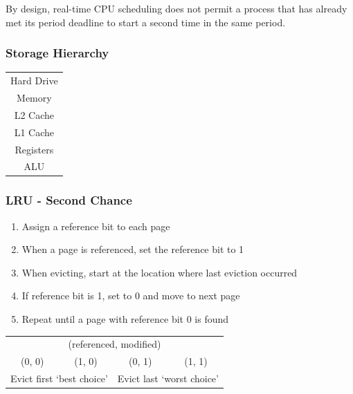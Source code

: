 \documentclass[a4paper]{article}
\begin{document}
\begin{multicols*}{2}
    By design, real-time CPU scheduling does not permit a process that has
    already met its period deadline to start a second time in the same period.

    \setlength{\columnsep}{-15em}
    \begin{multicols*}{2}
        \subsubsection*{Storage Hierarchy}
        \begin{tabular}{|c|}
            \hline
            Hard Drive \\
            Memory     \\
            L2 Cache   \\
            L1 Cache   \\
            Registers  \\
            ALU        \\
            \hline
        \end{tabular}
        \columnbreak
        \begin{flushright}
            \subsubsection*{LRU - Second Chance}
            \begin{enumerate}
                \item Assign a reference bit to each page
                \item When a page is referenced, set the reference bit to 1
                \item When evicting, start at the location where last eviction occurred
                \item If reference bit is 1, set to 0 and move to next page
                \item Repeat until a page with reference bit 0 is found
            \end{enumerate}
        \end{flushright}
    \end{multicols*}

    \vspace*{-2em}
    \begin{center}
        \begin{tabular}{cccc}
            \multicolumn{4}{c}{(referenced, modified)}                                                                      \\
            (0, 0)                                        & (1, 0)                                        & (0, 1) & (1, 1) \\
            \multicolumn{2}{l}{Evict first `best choice'} & \multicolumn{2}{r}{Evict last `worst choice'}
        \end{tabular}
    \end{center}


\end{multicols*}
\end{document}
